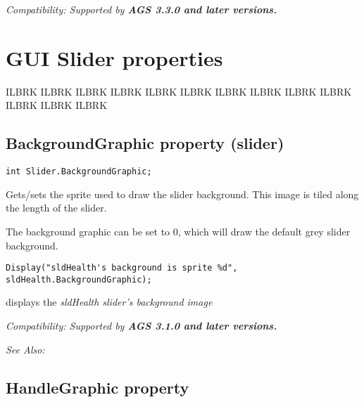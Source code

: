 \it{Compatibility:} Supported by \bf{AGS 3.3.0} and later versions.



\section{GUI Slider properties}%

ILBRK
ILBRK
ILBRK
ILBRK
ILBRK
ILBRK
ILBRK
ILBRK
ILBRK
ILBRK
ILBRK
ILBRK
ILBRK


\subsection{BackgroundGraphic property (slider)}\label{Slider.BackgroundGraphic}%

\begin{verbatim}
int Slider.BackgroundGraphic;
\end{verbatim}
Gets/sets the sprite used to draw the slider background. This image is tiled along the length
of the slider.

The background graphic can be set to 0, which will draw the default grey slider background.

\begin{verbatim}
Display("sldHealth's background is sprite %d", sldHealth.BackgroundGraphic);
\end{verbatim}
displays the \it{sldHealth} slider's background image

\it{Compatibility:} Supported by \bf{AGS 3.1.0} and later versions.

\it{See Also:} 


\subsection{HandleGraphic property}\label{Slider.HandleGraphic}%

